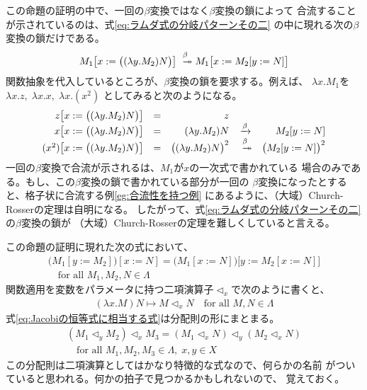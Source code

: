 {	この命題の証明の中で、一回の$\beta$変換ではなく$\beta$変換の鎖によって
	合流することが示されているのは、式\eqref{eq:ラムダ式の分岐パターンその二}
	の中に現れる次の$\beta$変換の鎖だけである。
	\begin{equation*}\begin{split}
		M_1\bigl[x:=\bigl((\lambda y.M_2)N\bigr)\bigr]
		\xtoto{\beta}M_1\bigl[x:=M_2[y:=N]\bigr]
	\end{split}\end{equation*}
	関数抽象を代入しているところが、$\beta$変換の鎖を要求する。例えば、
	$\lambda x.M_1$を$\lambda x.z,\;\lambda x.x,\;\lambda x.(x^2)$
	としてみると次のようになる。
	\begin{equation*}\begin{array}{rcrcr}
		z\bigl[x:=\bigl((\lambda y.M_2)N\bigr)\bigr] &=& z \\
		x\bigl[x:=\bigl((\lambda y.M_2)N\bigr)\bigr] &=& (\lambda y.M_2)N
			&\xto{\beta}& M_2[y:=N] \\
		(x^2)\bigl[x:=\bigl((\lambda y.M_2)N\bigr)\bigr] 
			&=& \bigl((\lambda y.M_2)N\bigr)^2
			&\xtoto{\beta}& \bigl(M_2[y:=N]\bigr)^2
	\end{array}\end{equation*}
	一回の$\beta$変換で合流が示されるは、$M_1$が$x$の一次式で書かれている
	場合のみである。もし、この$\beta$変換の鎖で書かれている部分が一回の
	$\beta$変換になったとすると、格子状に合流する例\ref{eg:合流性を持つ例}
	にあるように、（大域）Church-Rosserの定理は自明になる。
	したがって、式\eqref{eq:ラムダ式の分岐パターンその二}の$\beta$変換の鎖が
	（大域）Church-Rosserの定理を難しくしていると言える。

	この命題の証明に現れた次の式において、
	\begin{equation}\label{eq:Jacobiの恒等式に相当する式}\begin{split}
		\bigl(M_1[y:=M_2]\bigr)[x:=N] 
		= \bigl(M_1[x:=N]\bigr)\bigl[y:=M_2[x:=N]\bigr] \\
		\quad\text{for all } M_1,M_2,N\in \Lambda
	\end{split}\end{equation}
	関数適用を変数をパラメータに持つ二項演算子$\lhd_x$で次のように書くと、
	\begin{equation*}\begin{split}
		(\lambda x.M)N \mapsto M\lhd_x N \quad\text{for all } M,N\in\Lambda
	\end{split}\end{equation*}
	式\eqref{eq:Jacobiの恒等式に相当する式}は分配則の形にまとまる。
	\begin{equation}\label{eq:Jacobiの恒等式に相当する式その二}\begin{split}
		(M_1\lhd_y M_2)\lhd_x M_3 = (M_1\lhd_x N)\lhd_y(M_2\lhd_x N) \\
		\quad\text{for all } M_1,M_2,M_3\in\Lambda,\;x,y\in X
	\end{split}\end{equation}
	この分配則は二項演算としてはかなり特徴的な式なので、何らかの名前
	がついていると思われる。何かの拍子で見つかるかもしれないので、
	覚えておく。

}

